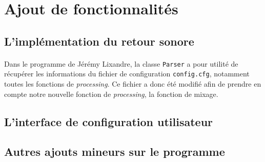 \section{Ajout de fonctionnalités}

\subsection{L'implémentation du retour sonore}
\paragraph{}
Dans le programme de Jérémy Lixandre, la classe \verb!Parser! a pour utilité de récupérer les informations du fichier de configuration \verb!config.cfg!, notamment toutes les fonctions de \textit{processing}. Ce fichier a donc été modifié afin de prendre en compte notre nouvelle fonction de \textit{processing}, la fonction de mixage.

\subsection{L'interface de configuration utilisateur}

\subsection{Autres ajouts mineurs sur le programme}
